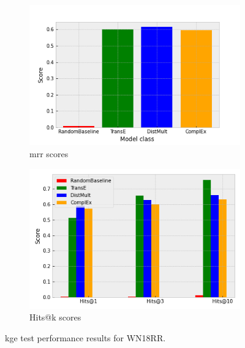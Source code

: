 \begin{figure}[htbp]
\centering
\begin{subfigure}{.5\textwidth}
  \centering
  \includegraphics[width=1\linewidth]{figures/model_selection/wn18rr_mrr.png}
  \caption{\gls{mrr} scores}
  \label{fig:model_selection_mrr_wn18rr}
\end{subfigure}%
\begin{subfigure}{.5\textwidth}
  \centering
  \includegraphics[width=1\linewidth]{figures/model_selection/wn18rr_hit_scores.png}
  \caption{Hits@k scores}
  \label{fig:model_selection_hit_scores_wn18rr}
\end{subfigure}
\caption[KGE test results for WN18RR KG.]{\gls{kge} test performance results for WN18RR.}
\label{fig:model_selection_metrics_wn18rr}
\end{figure}



